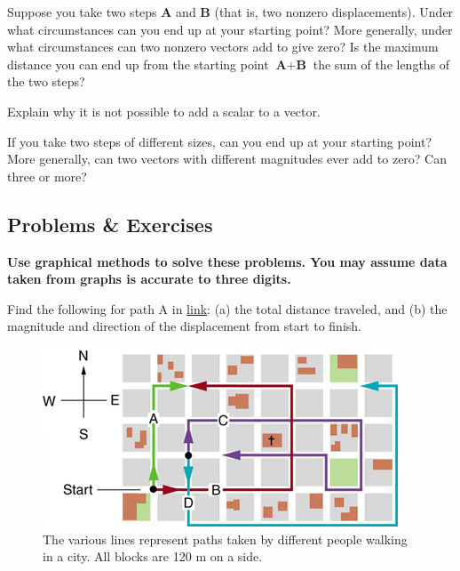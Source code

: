 \documentclass[
]{book}
\begin{document}
\hypertarget{fs-id1165298754450}{}
\leavevmode{}%
Suppose you take two steps \(\textbf{A}\) and \(\textbf{B}\) (that is, two
nonzero displacements). Under what circumstances can you end up at your
starting point? More generally, under what circumstances can two nonzero
vectors add to give zero? Is the maximum distance you can end up from
the starting point \(\textbf{A} + \textbf{B}\) the sum of the lengths of
the two steps?

\hypertarget{fs-id1165298761188}{}
\leavevmode{}%
Explain why it is not possible to add a scalar to a vector.

\hypertarget{fs-id1165296242489}{}
\leavevmode{}%
If you take two steps of different sizes, can you end up at your
starting point? More generally, can two vectors with different
magnitudes ever add to zero? Can three or more?

\hypertarget{fs-id1165298586130}{}
\hypertarget{problems-exercises-6}{%
\subsection{Problems \& Exercises}\label{problems-exercises-6}}

\textbf{Use graphical methods to solve these problems. You may assume data
taken from graphs is accurate to three digits.}

\hypertarget{fs-id1165298745593}{}
\leavevmode{}%
Find the following for path A in
\protect\hyperlink{import-auto-id1165298872310}{link}: (a) the
total distance traveled, and (b) the magnitude and direction of the
displacement from start to finish.

\begin{figure}
\hypertarget{import-auto-id1165298872310}{%
\centering
\includegraphics{images/Figure_03_02_20a.jpg}
\caption{The various lines represent paths taken by different people walking in
a city. All blocks are 120 m on a
side.}\label{import-auto-id1165298872310}
}
\end{figure}
\end{document}
